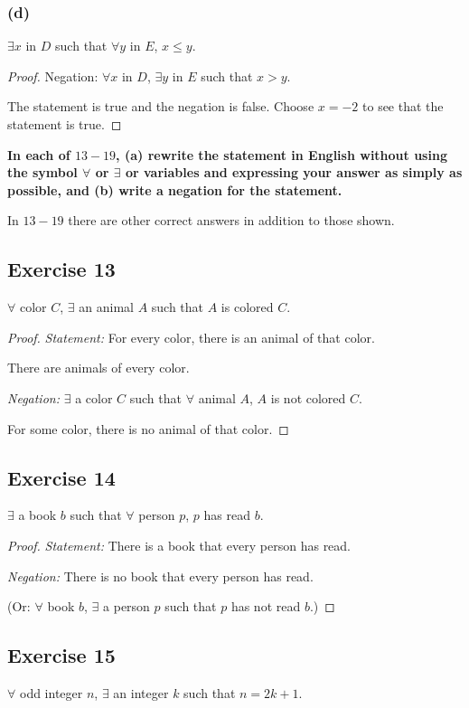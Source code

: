 \documentclass[14pt]{extarticle}
\newcommand{\fa}{\forall}
\newcommand{\te}{\exists}
\begin{document}
\subsubsection{(d)}
$\te x$ in $D$ such that $\fa y$ in $E$, $x \leq y$.

\begin{proof}
    Negation: $\fa x$ in $D$, $\te y$ in $E$ such that $x > y$.

    The statement is true and the negation is false. Choose $x = -2$ to see that the statement is true.
\end{proof}

{\bf \color{cyan} In each of $13-19$, (a) rewrite the statement in English without using the symbol $\fa$ or $\te$ or variables and expressing your answer as simply as possible, and (b) write a negation for the statement.

In $13-19$ there are other correct answers in addition to
those shown.}

\subsection{Exercise 13}
$\fa$ color $C$, $\te$ an animal $A$ such that $A$ is colored $C$.

\begin{proof}
    {\it Statement:} For every color, there is an animal of
    that color.

    There are animals of every color.

        {\it Negation:} $\te$ a color $C$ such that $\fa$ animal $A$, $A$ is not colored $C$.

    For some color, there is no animal of that color.
\end{proof}

\subsection{Exercise 14}
$\te$ a book $b$ such that $\fa$ person $p$, $p$ has read $b$.

\begin{proof}
    {\it Statement:} There is a book that every person has read.

        {\it Negation:} There is no book that every person has read.

    (Or: $\fa$ book $b$, $\te$ a person $p$ such that $p$ has not read $b$.)
\end{proof}

\subsection{Exercise 15}
$\fa$ odd integer $n$, $\te$ an integer $k$ such that $n = 2k + 1$.
\end{document}
